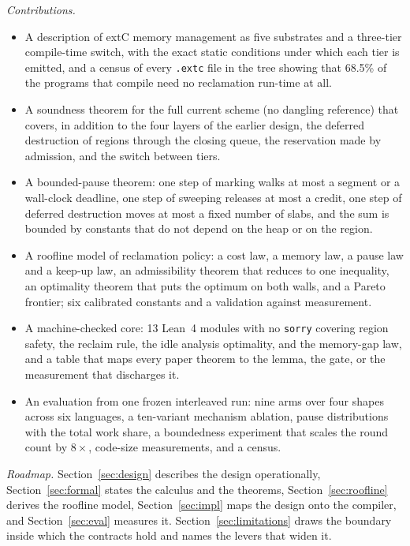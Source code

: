 \noindent\emph{Contributions.}
\begin{itemize}
\item A description of extC memory management as five substrates and a three-tier compile-time switch, with the exact
  static conditions under which each tier is emitted, and a census of every \texttt{.extc} file in the tree showing that
  68.5\% of the programs that compile need no reclamation run-time at all.
\item A soundness theorem for the full current scheme (no dangling reference) that covers, in addition to the four layers of
  the earlier design, the deferred destruction of regions through the closing queue, the reservation made by admission, and
  the switch between tiers.
\item A bounded-pause theorem: one step of marking walks at most a segment or a wall-clock deadline, one step of sweeping
  releases at most a credit, one step of deferred destruction moves at most a fixed number of slabs, and the sum is bounded
  by constants that do not depend on the heap or on the region.
\item A roofline model of reclamation policy: a cost law, a memory law, a pause law and a keep-up law, an admissibility
  theorem that reduces to one inequality, an optimality theorem that puts the optimum on both walls, and a Pareto frontier;
  six calibrated constants and a validation against measurement.
\item A machine-checked core: 13 Lean~4 modules with no \texttt{sorry} covering region safety, the reclaim rule, the idle
  analysis optimality, and the memory-gap law, and a table that maps every paper theorem to the lemma, the gate, or the
  measurement that discharges it.
\item An evaluation from one frozen interleaved run: nine arms over four shapes across six languages, a ten-variant mechanism
  ablation, pause distributions with the total work share, a boundedness experiment that scales the round count by $8\times$,
  code-size measurements, and a census.
\end{itemize}


\noindent\emph{Roadmap.}
Section~\ref{sec:design} describes the design operationally, Section~\ref{sec:formal} states the calculus and the theorems,
Section~\ref{sec:roofline} derives the roofline model, Section~\ref{sec:impl} maps the design onto the compiler, and
Section~\ref{sec:eval} measures it. Section~\ref{sec:limitations} draws the boundary inside which the contracts hold
and names the levers that widen it.

